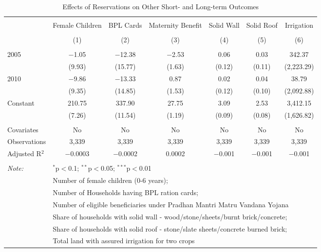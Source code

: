 
\begin{table}[!htbp] \centering 
  \caption{Effects of Reservations on Other Short- and Long-term Outcomes} 
  \label{raj_shrug_other_05_10} 
\scriptsize 
\begin{tabular}{@{\extracolsep{5pt}}lcccccc} 
\\[-1.8ex]\hline 
\hline \\[-1.8ex] 
 & Female Children & BPL Cards & Maternity Benefit & Solid Wall & Solid Roof & Irrigation \\ 
\\[-1.8ex] & (1) & (2) & (3) & (4) & (5) & (6)\\ 
\hline \\[-1.8ex] 
 2005 & $-$1.05 & $-$12.38 & $-$2.53 & 0.06 & 0.03 & 342.37 \\ 
  & (9.93) & (15.77) & (1.63) & (0.12) & (0.11) & (2,223.29) \\ 
  2010 & $-$9.86 & $-$13.33 & 0.87 & 0.02 & 0.04 & 38.79 \\ 
  & (9.35) & (14.85) & (1.53) & (0.12) & (0.10) & (2,092.88) \\ 
  Constant & 210.75 & 337.90 & 27.75 & 3.09 & 2.53 & 3,412.15 \\ 
  & (7.26) & (11.54) & (1.19) & (0.09) & (0.08) & (1,626.82) \\ 
 \hline \\[-1.8ex] 
Covariates & No & No & No & No & No & No \\ 
Observations & 3,339 & 3,339 & 3,339 & 3,339 & 3,339 & 3,339 \\ 
Adjusted R$^{2}$ & $-$0.0003 & $-$0.0002 & 0.0002 & $-$0.001 & $-$0.001 & $-$0.001 \\ 
\hline 
\hline \\[-1.8ex] 
\textit{Note:}  & \multicolumn{6}{l}{$^{*}$p$<$0.1; $^{**}$p$<$0.05; $^{***}$p$<$0.01} \\ 
 & \multicolumn{6}{l}{Number of female children (0-6 years);} \\ 
 & \multicolumn{6}{l}{Number of Households having BPL ration cards;} \\ 
 & \multicolumn{6}{l}{Number of eligible beneficiaries under Pradhan Mantri Matru Vandana Yojana} \\ 
 & \multicolumn{6}{l}{Share of households with solid wall - wood/stone/sheets/burnt brick/concrete;} \\ 
 & \multicolumn{6}{l}{Share of households with solid roof - stone/slate sheets/concrete burned brick;} \\ 
 & \multicolumn{6}{l}{Total land with assured irrigation for two crops} \\ 
\end{tabular} 
\end{table} 

